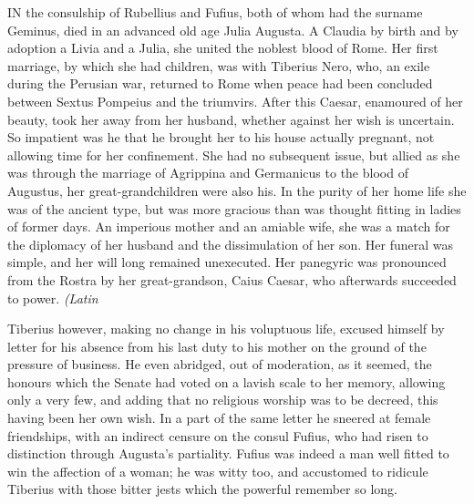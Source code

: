 
IN the consulship of Rubellius and Fufius, both of whom had the surname Geminus, died in an advanced old age Julia Augusta. A Claudia by birth and by adoption a Livia and a Julia, she united the noblest blood of Rome. Her first marriage, by which she had children, was with Tiberius Nero, who, an exile during the Perusian war, returned to Rome when peace had been concluded between Sextus Pompeius and the triumvirs. After this Caesar, enamoured of her beauty, took her away from her husband, whether against her wish is uncertain. So impatient was he that he brought her to his house actually pregnant, not allowing time for her confinement. She had no subsequent issue, but allied as she was through the marriage of Agrippina and Germanicus to the blood of Augustus, her great-grandchildren were also his. In the purity of her home life she was of the ancient type, but was more gracious than was thought fitting in ladies of former days. An imperious mother and an amiable wife, she was a match for the diplomacy of her husband and the dissimulation of her son. Her funeral was simple, and her will long remained unexecuted. Her panegyric was pronounced from the Rostra by her great-grandson, Caius Caesar, who afterwards succeeded to power. \emph{(Latin}


Tiberius however, making no change in his voluptuous life, excused himself by letter for his absence from his last duty to his mother on the ground of the pressure of business. He even abridged, out of moderation, as it seemed, the honours which the Senate had voted on a lavish scale to her memory, allowing only a very few, and adding that no religious worship was to be decreed, this having been her own wish. In a part of the same letter he sneered at female friendships, with an indirect censure on the consul Fufius, who had risen to distinction through Augusta's partiality. Fufius was indeed a man well fitted to win the affection of a woman; he was witty too, and accustomed to ridicule Tiberius with those bitter jests which the powerful remember so long.


